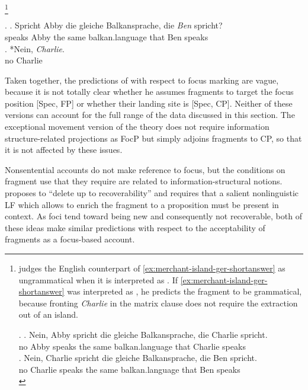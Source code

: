 %
\footnote{\citet{merchant2004} judges the English counterpart of \ref{ex:merchant-island-ger-shortanswer} as ungrammatical when it is interpreted as \Next[a]. If \ref{ex:merchant-island-ger-shortanswer} was interpreted as \Next[b], he predicts the fragment to be grammatical, because fronting \textit{Charlie} in the matrix clause does not require the extraction out of an island.

\ex. \ag. Nein, Abby spricht die gleiche Balkansprache, die Charlie spricht.\\
	 no Abby speaks the same balkan.language that Charlie speaks\\
     \bg. Nein, Charlie spricht die gleiche Balkansprache, die Ben spricht.\\
     	 no Charlie speaks the same balkan.language that Ben speaks\\
       
}
\afterfn%
%

\ex. \ag. Spricht Abby die gleiche Balkansprache, die \textit{Ben} spricht?\\
	  speaks Abby the same balkan.language that Ben speaks\\
\bg. *Nein, \textit{Charlie}.\label{ex:merchant-island-ger-shortanswer}\\
      no Charlie\\

Taken together, the predictions of \citet{merchant2004} with respect to focus marking are vague, because it is not totally clear whether he assumes fragments to target the focus position [Spec, FP] or whether their landing site is [Spec, CP]. Neither of these versions can account for the full range of the data discussed in this section. The exceptional movement version of the theory \citep{weir2014} does not require information structure-related projections as FocP but simply adjoins fragments to CP, so that it is not affected by these issues.

Nonsentential accounts do not make reference to focus, but the conditions on fragment use that they require are related to information-structural notions. \citet{barton1990} proposes to ``delete up to recoverability'' and \citet{stainton2006} requires that a salient nonlinguistic LF which allows to enrich the fragment to a proposition must be present in context. As foci tend toward being new and consequently not recoverable, both of these ideas make similar predictions with respect to the acceptability of fragments as a focus-based account.

